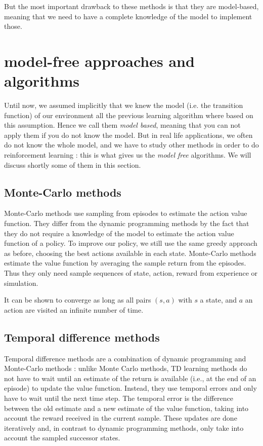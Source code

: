\documentclass[14pt,a4paper]{article}
\theoremstyle{definition}
\begin{document}
But the most important drawback to these methods is that they are model-based, meaning that we need to have a complete knowledge of the model to implement those.

\section{model-free approaches and algorithms}

Until now, we assumed implicitly that we knew the model (i.e. the transition function) of our environment all the previous learning algorithm where based on this assumption. Hence we call them \emph{model based}, meaning that you can not apply them if you do not know the model. But in real life applications, we often do not know the whole model, and we have to study other methods in order to do reinforcement learning : this is what gives us the \emph{model free} algorithms. We will discuss shortly some of them in this section.

\subsection{Monte-Carlo methods}
Monte-Carlo methods use sampling from episodes to estimate the action value function.
They differ from the dynamic programming methods by the fact that they do not require a knowledge of the model to estimate the action value function of a policy. To improve our policy, we still use the same greedy approach as before, choosing the best actions available in each state.
Monte-Carlo methods estimate the value function by averaging the sample return from the episodes. Thus they only need sample sequences of state, action, reward from experience or simulation. \citep{Sutton}


 It can be shown to converge as long as all pairs $(s,a)$ with $s$ a state, and $a$ an action are visited an infinite number of time.
\subsection{Temporal difference methods}
Temporal difference methods are a combination of dynamic programming and Monte-Carlo methods : unlike Monte Carlo methods, TD learning methods do not have to wait until an estimate of the return is available (i.e., at the end of an episode) to update the value function. Instead, they use temporal errors and only have to wait until the next time step. The temporal error is the difference between the old estimate and a new estimate of
the value function, taking into account the reward received in the current sample.
These updates are done iteratively and, in contrast to dynamic programming
methods, only take into account the sampled successor states. \citep{Xia2015}
\end{document}

